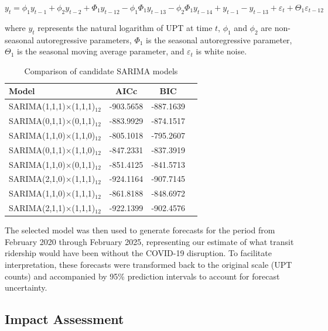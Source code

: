 \documentclass[11pt]{article}
\begin{document}
\begin{equation}
y_t = \phi_1 y_{t-1} + \phi_2 y_{t-2} + \Phi_1 y_{t-12} - \phi_1\Phi_1 y_{t-13} - \phi_2\Phi_1 y_{t-14} + y_{t-1} - y_{t-13} + \varepsilon_t + \Theta_1 \varepsilon_{t-12}
\end{equation}

where $y_t$ represents the natural logarithm of UPT at time $t$, $\phi_1$ and $\phi_2$ are non-seasonal autoregressive parameters, $\Phi_1$ is the seasonal autoregressive parameter, $\Theta_1$ is the seasonal moving average parameter, and $\varepsilon_t$ is white noise.

\begin{table}[!ht]
\caption{Comparison of candidate SARIMA models}
\label{t:model_comparison}
\begin{center}
\begin{tabular}{lccc}
\hline
Model & AICc & BIC\\
\hline
SARIMA(1,1,1)×(1,1,1)$_{12}$ & -903.5658 & -887.1639 \\
SARIMA(0,1,1)×(0,1,1)$_{12}$ & -883.9929 & -874.1517 \\
SARIMA(1,1,0)×(1,1,0)$_{12}$ & -805.1018 & -795.2607 \\
SARIMA(0,1,1)×(1,1,0)$_{12}$ & -847.2331 & -837.3919 \\
SARIMA(1,1,0)×(0,1,1)$_{12}$ & -851.4125 & -841.5713 \\
SARIMA(2,1,0)×(1,1,1)$_{12}$ & -924.1164 & -907.7145 \\
SARIMA(1,1,0)×(1,1,1)$_{12}$ & -861.8188 & -848.6972 \\
SARIMA(2,1,1)×(1,1,1)$_{12}$ & -922.1399 & -902.4576 \\
\hline
\end{tabular}
\end{center}
\end{table}

The selected model was then used to generate forecasts for the period from February 2020 through February 2025, representing our estimate of what transit ridership would have been without the COVID-19 disruption. To facilitate interpretation, these forecasts were transformed back to the original scale (UPT counts) and accompanied by 95\% prediction intervals to account for forecast uncertainty.

\subsection{Impact Assessment}
\end{document}

